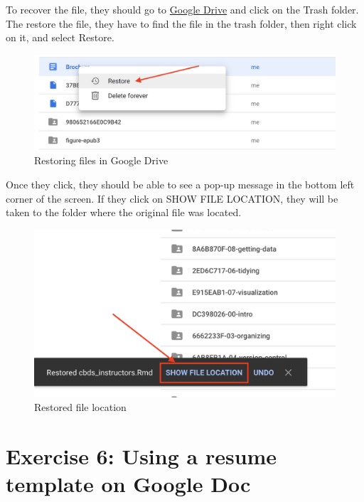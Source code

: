 \documentclass[]{book}
\begin{document}
To recover the file, they should go to \href{drive.google.com}{Google Drive} and click on the Trash folder. The restore the file, they have to find the file in the trash folder, then right click on it, and select Restore.

\begin{figure}
\centering
\includegraphics{./images/restoring_files.png}
\caption{Restoring files in Google Drive}
\end{figure}

Once they click, they should be able to see a pop-up message in the bottom left corner of the screen. If they click on SHOW FILE LOCATION, they will be taken to the folder where the original file was located.

\begin{figure}
\centering
\includegraphics{./images/restored_file_location.png}
\caption{Restored file location}
\end{figure}

\hypertarget{exercise-6-using-a-resume-template-on-google-doc}{%
\section*{Exercise 6: Using a resume template on Google Doc}\label{exercise-6-using-a-resume-template-on-google-doc}}
\end{document}
